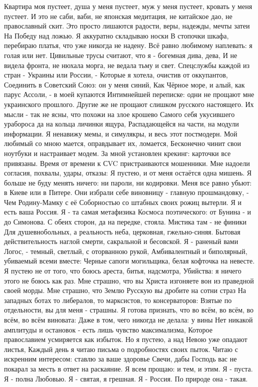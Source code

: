 \obeycr
\noindent Квартира моя пустеет, душа у меня пустеет, 
муж у меня пустеет, кровать у меня пустеет.
И это не саби, ваби, не японская медитация, 
не китайское дао, не православный скит.
\smallskip
Это просто лишаются радости, веры, надежды, мечты затеи
На Победу над ложью. Я аккуратно складываю носки
В стопочки шкафа, перебираю платья, что уже никогда не надену.
\smallskip
Всё равно любимому наплевать: я голая или нет.
Цивильные трусы считают, что я - богемная дива, дева,
И не видела фронта, не нюхала морга, не ведала тьму и свет.
\smallskip
Спецслужбы каждой из стран - Украины или России, -
Которые я хотела, очистив от оккупантов,
Соединить в Советский Союз: он у меня синий,
Как Чёрное море, и алый, как парус Ассоли, - в моей купаются
Интимнейшей переписке: одни не прощают мне украинского прошлого.
Другие же не прощают слишком русского настоящего.
\smallskip
Их мысли - так не ясны, что похожи на злое крошево
Самого себя укусившего урабороса да на кольца личинки ящура,
Распадающейся на части, на модули информации.
\smallskip
Я ненавижу мемы, и симулякры, и весь этот постмодерн.
Мой любимый со мною мается, оправдывает их, ломается,
Бесконечно чинит свои ноутбуки и настраивает модем.
\smallskip
За мной установлен крекинг: карточки все привязаны.
Время от времени к СVC пристраиваются мошенники.
\smallskip
Мне надоели согласия, похвалы, удары, отказы:
Я пустею, и от меня остаётся одна мишень.
Я больше не буду менять ничего: ни пароли, ни кодировки.
Меня все равно убьют: в Киеве или в Питере.
\smallskip
Они избрали себе виновницу - главную прошмандовку, -
Чем Родину-Мамку с её Соборностью со штабных своих рожиц вытерли.
Я и есть ваша Россия. Я - та самая метафизика
Космоса поэтического: от Бунина - и до Симонова.
\smallskip
С обеих сторон, да на передке, стояла. Мистика там - не финики
Для душевнобольных, а реальность неба, церковная, гжельно-синяя.
Бытовая действительность наглой смерти, сакральной и бесовской.
\smallskip
Я - раненый вами Логос, - темный, светлый, с оторванною рукой,
Амбивалентный и биполярный, убиваемый всеми вместе:
Черные сапоги могильщика, белая кофточка на невесте.
Я пустею не от того, что боюсь ареста, битья, надсмотра,
Убийства: я ничего этого не боюсь как раз.
\smallskip
Мне страшно, что вы Христа изгоняете вон из праведной своей морды.
Мне страшно, что Землю Русскую вы дробите на сотни страз
На западных ботах то либералов, то марксистов, то консерваторов:
Взятые по отдельности, вы для меня - страшны.
\smallskip
Я готова признать, что во всём, во всём, во всём, во всём виновата:
Даже в том, чего никогда не делала: у вины
Нет никакой амплитуды и остановок - есть лишь чувство максимализма,
Которое православием усмиряется как избыток.
\smallskip
Но я пустею, а над Невою уже опадают листья,
Каждый день я читаю письма о подробностях своих пыток.
Читаю с искренним интересом: ставлю за ваше здоровье
Свечи, дабы Господь вас не покарал за месть в ответ на раскаяние.
\smallskip
Я всем прощаю: и тем, и этим. Я - пуста. Я - полна Любовью.
Я - святая, я грешная.
Я - Россия. 
По природе она - такая. 
\restorecr


